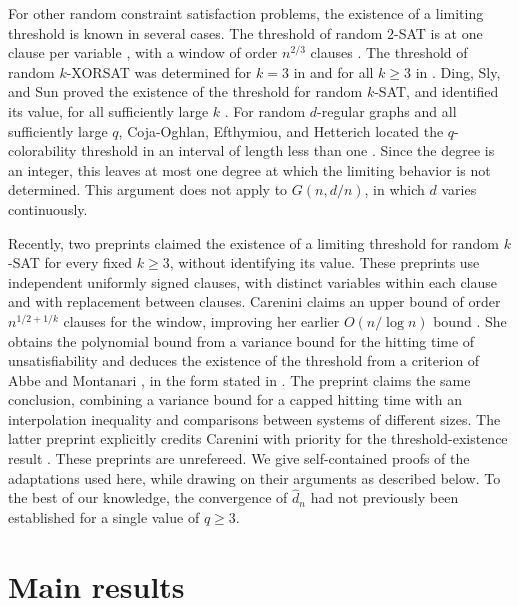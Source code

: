 For other random constraint satisfaction problems, the existence of a limiting threshold is known in several cases. The threshold of random $2$-SAT is at one clause per variable \cite{chvatal1992mick,goerdt1996threshold}, with a window of order $n^{2/3}$ clauses \cite[Theorem~1.1]{bollobas2001scaling}. The threshold of random $k$-XORSAT was determined for $k = 3$ in \cite{dubois2002xorsat} and for all $k \ge 3$ in \cite{pittel2016satisfiability}. Ding, Sly, and Sun proved the existence of the threshold for random $k$-SAT, and identified its value, for all sufficiently large $k$ \cite[Theorem~1]{ding2022proof}. For random $d$-regular graphs and all sufficiently large $q$, Coja-Oghlan, Efthymiou, and Hetterich located the $q$-colorability threshold in an interval of length less than one \cite[Theorem~1.1 and Corollary~1.2]{cojaoghlan2016chromaticb}. Since the degree is an integer, this leaves at most one degree at which the limiting behavior is not determined. This argument does not apply to $G(n, d/n)$, in which $d$ varies continuously.

Recently, two preprints claimed the existence of a limiting threshold for random $k$-SAT for every fixed $k \ge 3$, without identifying its value. These preprints use independent uniformly signed clauses, with distinct variables within each clause and with replacement between clauses. Carenini \cite[Theorem~1.1 and Corollary~1.2]{carenini2026polynomial} claims an upper bound of order $n^{1/2 + 1/k}$ clauses for the window, improving her earlier $O(n/\log n)$ bound \cite[Corollary~7.10]{carenini2026scaling}. She obtains the polynomial bound from a variance bound for the hitting time of unsatisfiability and deduces the existence of the threshold from a criterion of Abbe and Montanari \cite{abbe2014concentration}, in the form stated in \cite[Proposition~14]{perkins2025searching}. The preprint \cite[Theorem~1.1]{openai2026limiting} claims the same conclusion, combining a variance bound for a capped hitting time with an interpolation inequality and comparisons between systems of different sizes. The latter preprint explicitly credits Carenini with priority for the threshold-existence result \cite[abstract and Section~1]{openai2026limiting}. These preprints are unrefereed. We give self-contained proofs of the adaptations used here, while drawing on their arguments as described below. To the best of our knowledge, the convergence of $\hat d_n$ had not previously been established for a single value of $q \ge 3$.

\section{Main results}\label{sec:intro-results}


